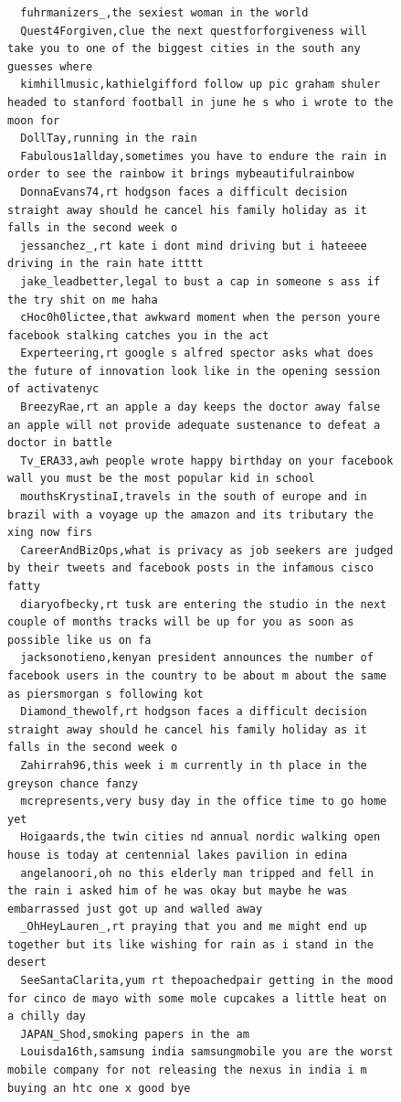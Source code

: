 \begin{figure}[htpb]
\begin{verbatim}
  fuhrmanizers_,the sexiest woman in the world
  Quest4Forgiven,clue the next questforforgiveness will take you to one of the biggest cities in the south any guesses where
  kimhillmusic,kathielgifford follow up pic graham shuler headed to stanford football in june he s who i wrote to the moon for
  DollTay,running in the rain
  Fabulous1allday,sometimes you have to endure the rain in order to see the rainbow it brings mybeautifulrainbow
  DonnaEvans74,rt hodgson faces a difficult decision straight away should he cancel his family holiday as it falls in the second week o
  jessanchez_,rt kate i dont mind driving but i hateeee driving in the rain hate itttt
  jake_leadbetter,legal to bust a cap in someone s ass if the try shit on me haha
  cHoc0h0lictee,that awkward moment when the person youre facebook stalking catches you in the act
  Experteering,rt google s alfred spector asks what does the future of innovation look like in the opening session of activatenyc
  BreezyRae,rt an apple a day keeps the doctor away false an apple will not provide adequate sustenance to defeat a doctor in battle
  Tv_ERA33,awh people wrote happy birthday on your facebook wall you must be the most popular kid in school
  mouthsKrystinaI,travels in the south of europe and in brazil with a voyage up the amazon and its tributary the xing now firs
  CareerAndBizOps,what is privacy as job seekers are judged by their tweets and facebook posts in the infamous cisco fatty
  diaryofbecky,rt tusk are entering the studio in the next couple of months tracks will be up for you as soon as possible like us on fa
  jacksonotieno,kenyan president announces the number of facebook users in the country to be about m about the same as piersmorgan s following kot
  Diamond_thewolf,rt hodgson faces a difficult decision straight away should he cancel his family holiday as it falls in the second week o
  Zahirrah96,this week i m currently in th place in the greyson chance fanzy
  mcrepresents,very busy day in the office time to go home yet
  Hoigaards,the twin cities nd annual nordic walking open house is today at centennial lakes pavilion in edina
  angelanoori,oh no this elderly man tripped and fell in the rain i asked him of he was okay but maybe he was embarrassed just got up and walled away
  _OhHeyLauren_,rt praying that you and me might end up together but its like wishing for rain as i stand in the desert
  SeeSantaClarita,yum rt thepoachedpair getting in the mood for cinco de mayo with some mole cupcakes a little heat on a chilly day
  JAPAN_Shod,smoking papers in the am
  Louisda16th,samsung india samsungmobile you are the worst mobile company for not releasing the nexus in india i m buying an htc one x good bye

\end{verbatim}
\end{figure}
